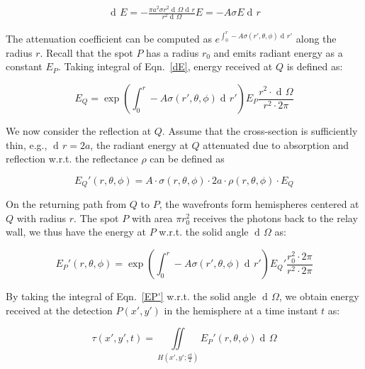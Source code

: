 \documentclass[10pt,journal,compsoc]{IEEEtran}
\DeclareMathOperator{\di}{d\!}
\begin{document}
\begin{equation}
\begin{split}
\di{E} = -\frac{\pi a^{2} \sigma r^{2} \di{\Omega} \di{r}}{r^{2} \di{\Omega}}E = -A \sigma E \di{r}
\end{split}
\label{dE}
\end{equation}

The attenuation coefficient can be computed as $e^{\int_{0}^{r}-A\sigma(r',\theta,\phi) \di{r'}}$ along the radius $r$. Recall that the spot $P$ has a radius $r_0$ and emits radiant energy as a constant $E_P$. Taking integral of Eqn.~\ref{dE}, energy received at $Q$ is defined as: 

\begin{equation}
E_{Q} =  \exp{\left(\int_{0}^{r}-A\sigma(r',\theta,\phi) \di{r'}\right)} E_P \frac{r^2 \cdot \di{\Omega}}{r^2 \cdot 2\pi}
\label{EQ}
\end{equation}

We now consider the reflection at $Q$. Assume that the cross-section is sufficiently thin, e.g., $\di{r}=2a$, the radiant energy at $Q$ attenuated due to absorption and reflection w.r.t. the reflectance $\rho$ can be defined as

\begin{equation}
E_{Q}'(r, \theta, \phi) = A \cdot \sigma(r, \theta, \phi) \cdot 2a \cdot \rho(r, \theta, \phi) \cdot E_{Q}
\label{EQ'}
\end{equation}

On the returning path from $Q$ to $P$, the wavefronts form hemispheres centered at $Q$ with radius $r$. The spot $P$ with area $\pi r_0^2$ receives the photons back to the relay wall, we thus have the energy at $P$ w.r.t. the solid angle $\di{\Omega}$ as: 

\begin{equation}
E_{P}'(r, \theta, \phi) =  \exp{\left(\int_{0}^{r}-A\sigma(r',\theta,\phi) \di{r'}\right)} E_{Q}'\frac{r_0^2 \cdot 2\pi}{ r^2 \cdot 2\pi} 
\label{EP'}
\end{equation}

By taking the integral of Eqn.~\ref{EP'} w.r.t. the solid angle $\di{\Omega}$, we obtain energy received at the detection $P(x', y')$ in the hemisphere at a time instant $t$ as: 

\begin{equation}
   \tau(x', y', t) = \underset{H(x', y';\frac{ct}{2})}{\iint} E_{P}'(r, \theta, \phi) \di{\Omega}
 \label{tauIni}
\end{equation}
\end{document}
